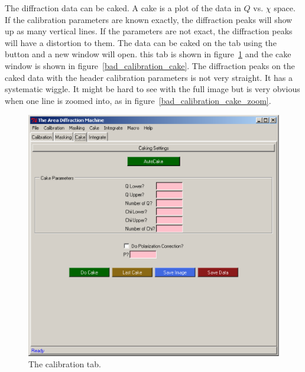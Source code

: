 The diffraction data can be caked. A cake is a plot
of the data in $Q$ vs. $\chi$ space. 
If the calibration parameters are known exactly, 
the diffraction peaks will show up as many vertical lines.
If the parameters are not exact, the diffraction peaks
will have a distortion to them.
The data can be caked on the  tab using the 
 button and a new window will open. 
this tab is shown in figure~\ref{cake_tab_example} 
and the cake window is shown in 
figure~\ref{bad_calibration_cake}.
The diffraction peaks on the caked data with the header 
calibration parameters is not very straight. It has a 
systematic wiggle. It might be hard to see 
with the full image but is very obvious when one line
is zoomed into, as in 
figure~\ref{bad_calibration_cake_zoom}.


\begin{figure}
    \centering
    \includegraphics[scale=.75]
    {figures/caking_tab.eps}
    \caption{The calibration tab.}
    \label{cake_tab_example}
\end{figure}

